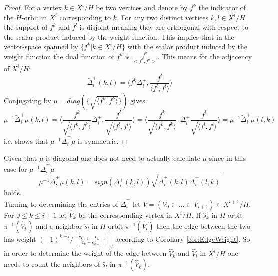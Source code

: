 \documentclass[11pt]{amsart}
\newcommand{\iprod}[1]{\langle#1\rangle}
\newcommand{\gBinom}{\genfrac{[}{]}{0pt}{}}
\begin{document}
    \begin{proof}
        For a vertex $k\in X^i/H$ be two vertices and denote by $f^k$ the indicator of the $H$-orbit in $X^i$ corresponding to $k$. For any two distinct vertices $k,l\in X^i/H$ the support of $f^k$ and $f^l$ is disjoint meaning they are orthogonal with respect to the scalar product induced by the weight function. This implies that in the vector-space spanned by $\{f^k|k\in X^i/H\}$ with the scalar product induced by the weight function the dual function of $f^k$ is $\frac{f^k}{<f^k,f^k>}$. This means for the adjacency of $X^i/H$:
        \begin{equation}
            \tilde{\Delta}_i^+(k,l)=\iprod{f^k\Delta_i^+, \frac{f^l}{\iprod{f^l,f^l}}}
        \end{equation}
        Conjugating by $\mu=diag(\{\sqrt{\iprod{f^k,f^k}}\})$ gives:
        \begin{equation}
            \mu^{-1}\tilde{\Delta}_i^+\mu(k,l)=\iprod{\frac{f^k}{\sqrt{\iprod{f^k,f^k}}}\Delta_i^+, \frac{f^l}{\sqrt{\iprod{f^l,f^l}}}}=\iprod{\frac{f^k}{\sqrt{\iprod{f^k,f^k}}}, \Delta_i^+\frac{f^l}{\sqrt{\iprod{f^l,f^l}}}}=\mu^{-1}\tilde{\Delta}_i^+\mu(l,k)
        \end{equation}
        i.e. shows that $\mu^{-1}\tilde{\Delta}_i^+\mu$ is symmetric. 
    \end{proof}
    Given that $\mu$ is diagonal one does not need to actually calculate $\mu$ since in this case for $\mu^{-1}\tilde{\Delta}_i^+\mu$
    \begin{equation}
        \mu^{-1}\tilde{\Delta}_i^+\mu(k,l)=sign(\Delta_i^+(k,l))\sqrt{\tilde{\Delta}_i^+(k,l)\tilde{\Delta}_i^+(l,k)}
        \label{eq:SymmetricCurvature}
    \end{equation}
    holds.\\
    Turning to determining the entries of $\tilde{\Delta}_i^+$ let $V=(V_0\subset\dots\subset V_{i+1})\in X^{i+1}/H$. For $0\leq k\leq i+1$  let $\hat{V}_k$ be the corresponding vertex in $X^i/H$. If $\hat{s}_k$ in $H$-orbit $\pi^{-1}(\hat{V}_k)$ and a neighbor $\hat{s}_l$ in $H$-orbit $\pi^{-1}(\hat{V}_l)$ then the edge between the two has weight $(-1)^{k+l}/\gBinom{c_{k+1}-c_{k-1}}{c_k-c_{k-1}}_q$ according to Corollary \ref{cor:EdgeWeight}. So in order to determine the weight of the edge between $\hat{V}_k$ and $\hat{V}_l$ in $X^i/H$ one needs to count the neighbors of $\hat{s}_l$ in $\pi^{-1}(\hat{V}_k)$.  
\end{document}
